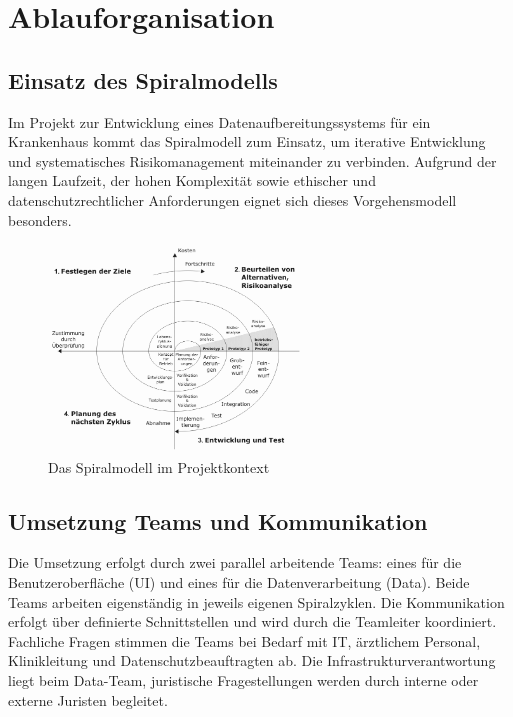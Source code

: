 {\let\clearpage\relax
\chapter{Ablauforganisation}}
\label{sec:ablauforganisation}

\section{Einsatz des Spiralmodells}
Im Projekt zur Entwicklung eines Datenaufbereitungssystems für ein Krankenhaus kommt das Spiralmodell zum Einsatz, um iterative Entwicklung und systematisches Risikomanagement miteinander zu verbinden. Aufgrund der langen Laufzeit, der hohen Komplexität sowie ethischer und datenschutzrechtlicher Anforderungen eignet sich dieses Vorgehensmodell besonders.

\begin{figure}[ht]
  \centering
  \includegraphics[width=0.6\textwidth]{fig/Spiralmodel_nach_Boehm.png}
  \caption{Das Spiralmodell im Projektkontext}
\end{figure}

\section{Umsetzung Teams und Kommunikation}
Die Umsetzung erfolgt durch zwei parallel arbeitende Teams: eines für die Benutzeroberfläche (UI) und eines für die Datenverarbeitung (Data). Beide Teams arbeiten eigenständig in jeweils eigenen Spiralzyklen. Die Kommunikation erfolgt über definierte Schnittstellen und wird durch die Teamleiter koordiniert. Fachliche Fragen stimmen die Teams bei Bedarf mit IT, ärztlichem Personal, Klinikleitung und Datenschutzbeauftragten ab. Die Infrastrukturverantwortung liegt beim Data-Team, juristische Fragestellungen werden durch interne oder externe Juristen begleitet.


